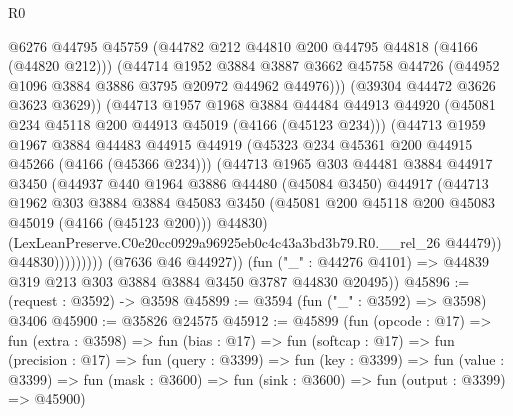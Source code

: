 \begin{lexlean}{R0}
\begin{coremodule}
                        @6276
                        @44795
                        @45759
                        (@44782 @212 @44810 @200 @44795 @44818 (@4166 (@44820 @212)))
                        (@44714
                          @1952
                          @3884
                          @3887
                          @3662
                          @45758
                          @44726
                          (@44952 @1096 @3884 @3886 @3795 @20972 @44962 @44976)))
                      (@39304 @44472 @3626 @3623 @3629))
                    (@44713
                      @1957
                      @1968
                      @3884
                      @44484
                      @44913
                      @44920
                      (@45081 @234 @45118 @200 @44913 @45019 (@4166 (@45123 @234)))
                      (@44713
                        @1959
                        @1967
                        @3884
                        @44483
                        @44915
                        @44919
                        (@45323 @234 @45361 @200 @44915 @45266 (@4166 (@45366 @234)))
                        (@44713
                          @1965
                          @303
                          @44481
                          @3884
                          @44917
                          @3450
                          (@44937
                            @440
                            @1964
                            @3886
                            @44480
                            (@45084 @3450)
                            @44917
                            (@44713
                              @1962
                              @303
                              @3884
                              @3884
                              @45083
                              @3450
                              (@45081 @200 @45118 @200 @45083 @45019 (@4166 (@45123 @200)))
                              @44830)
                            (LexLeanPreserve.C0e20cc0929a96925eb0c4c43a3bd3b79.R0.__rel_26 @44479))
                          @44830)))))))))
        (@7636 @46 @44927))
      (fun ("_" : @44276 @4101) => @44839 @319 @213 @303 @3884 @3884 @3450 @3787 @44830 @20495))
@45896 := (request : @3592) -> @3598
@45899 := @3594 (fun ("_" : @3592) => @3598) @3406
@45900 := @35826 @24575
@45912 := @45899
    (fun (opcode : @17) =>
    fun (extra : @3598) =>
    fun (bias : @17) =>
    fun (softcap : @17) =>
    fun (precision : @17) =>
    fun (query : @3399) =>
    fun (key : @3399) =>
    fun (value : @3399) =>
    fun (mask : @3600) => fun (sink : @3600) => fun (output : @3399) => @45900)

\end{coremodule}
\end{lexlean}
